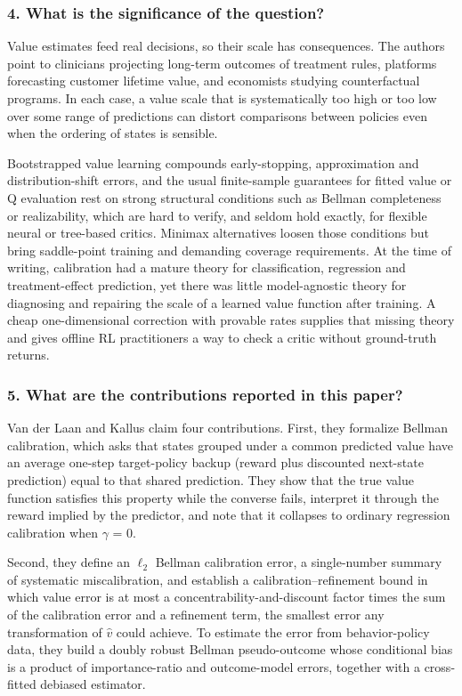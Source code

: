 \documentclass[11pt]{article}
\newcommand{\question}[1]{\subsubsection*{#1}}
\begin{document}
\question{4. What is the significance of the question?}

Value estimates feed real decisions, so their scale has consequences. The authors point to clinicians projecting long-term outcomes of treatment rules, platforms forecasting customer lifetime value, and economists studying counterfactual programs. In each case, a value scale that is systematically too high or too low over some range of predictions can distort comparisons between policies even when the ordering of states is sensible.

Bootstrapped value learning compounds early-stopping, approximation and distribution-shift errors, and the usual finite-sample guarantees for fitted value or Q evaluation rest on strong structural conditions such as Bellman completeness or realizability, which are hard to verify, and seldom hold exactly, for flexible neural or tree-based critics. Minimax alternatives loosen those conditions but bring saddle-point training and demanding coverage requirements. At the time of writing, calibration had a mature theory for classification, regression and treatment-effect prediction, yet there was little model-agnostic theory for diagnosing and repairing the scale of a learned value function after training. A cheap one-dimensional correction with provable rates supplies that missing theory and gives offline RL practitioners a way to check a critic without ground-truth returns.

\question{5. What are the contributions reported in this paper?}

Van der Laan and Kallus claim four contributions. First, they formalize Bellman calibration, which asks that states grouped under a common predicted value have an average one-step target-policy backup (reward plus discounted next-state prediction) equal to that shared prediction. They show that the true value function satisfies this property while the converse fails, interpret it through the reward implied by the predictor, and note that it collapses to ordinary regression calibration when \ensuremath{\gamma} = 0.

Second, they define an $\ell_2$ Bellman calibration error, a single-number summary of systematic miscalibration, and establish a calibration--refinement bound in which value error is at most a concentrability-and-discount factor times the sum of the calibration error and a refinement term, the smallest error any transformation of $\hat{v}$ could achieve. To estimate the error from behavior-policy data, they build a doubly robust Bellman pseudo-outcome whose conditional bias is a product of importance-ratio and outcome-model errors, together with a cross-fitted debiased estimator.
\end{document}
